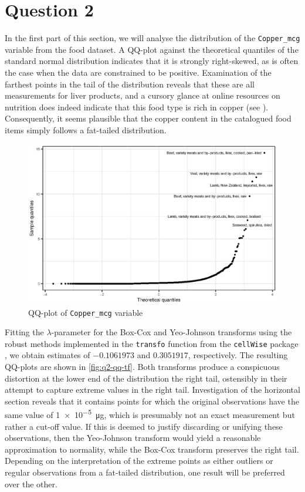 \documentclass[titlepage]{article}
\begin{document}
\section*{Question 2}

In the first part of this section, we will analyse the distribution of the \texttt{Copper\_mcg} variable from the food dataset. A QQ-plot against the theoretical quantiles of the standard normal distribution indicates that it is strongly right-skewed, as is often the case when the data are constrained to be positive. Examination of the farthest points in the tail of the distribution reveals that these are all measurements for liver products, and a cursory glance at online resources on nutrition does indeed indicate that this food type is rich in copper (see \cite{liver}). Consequently, it seems plausible that the copper content in the catalogued food items simply follows a fat-tailed distribution.

\begin{figure}[!htb]
  \centering
  \includegraphics{q2-qq-orig}
  \caption{QQ-plot of \texttt{Copper\_mcg} variable}
  \label{fig:q2-qq-orig}
\end{figure}

Fitting the $\lambda$-parameter for the Box-Cox and Yeo-Johnson transforms using the robust methods implemented in the \texttt{transfo} function from the \texttt{cellWise} package \cite{cellwise}, we obtain estimates of $-0.1061973$ and $0.3051917$, respectively. The resulting QQ-plots are shown in \cref{fig:q2-qq-tf}. Both transforms produce a conspicuous distortion at the lower end of the distribution the right tail, ostensibly in their attempt to capture extreme values in the right tail. Investigation of the horizontal section reveals that it contains points for which the original observations have the same value of \SI{1e-5}{\micro \gram}, which is presumably not an exact measurement but rather a cut-off value. If this is deemed to justify discarding or unifying these observations, then the Yeo-Johnson transform would yield a reasonable approximation to normality, while the Box-Cox transform preserves the right tail. Depending on the interpretation of the extreme points as either outliers or regular observations from a fat-tailed distribution, one result will be preferred over the other.
\end{document}
